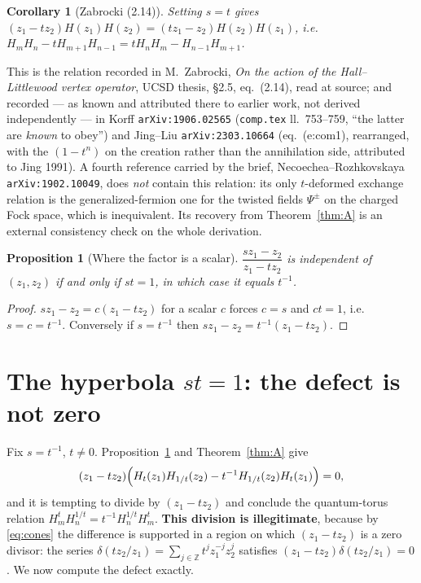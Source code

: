 \documentclass[11pt]{article}
\newtheorem{proposition}[theorem]{Proposition}
\newtheorem{corollary}[theorem]{Corollary}
\theoremstyle{definition}
\newcommand{\Z}{\mathbb{Z}}
\newcommand{\Hop}{H}
\begin{document}
\begin{corollary}[Zabrocki (2.14)]
Setting $s=t$ gives $(z_1-tz_2)\Hop(z_1)\Hop(z_2)=(tz_1-z_2)\Hop(z_2)\Hop(z_1)$, i.e.
$\Hop_m\Hop_n-t\Hop_{m+1}\Hop_{n-1}=t\Hop_n\Hop_m-\Hop_{n-1}\Hop_{m+1}$.
\end{corollary}

This is the relation recorded in M.~Zabrocki, \emph{On the action of the Hall--Littlewood
vertex operator}, UCSD thesis, \S2.5, eq.~(2.14), read at source; and recorded --- as known
and attributed there to earlier work, not derived independently --- in Korff
\texttt{arXiv:1906.02565} (\texttt{comp.tex} ll.~753--759, ``the latter are \emph{known} to
obey'') and Jing--Liu \texttt{arXiv:2303.10664} (eq.~(e:com1), rearranged, with the $(1-t^n)$
on the creation rather than the annihilation side, attributed to Jing 1991). A fourth
reference carried by the brief, Necoechea--Rozhkovskaya \texttt{arXiv:1902.10049}, does
\emph{not} contain this relation: its only $t$-deformed exchange relation is the
generalized-fermion one for the twisted fields $\Psi^\pm$ on the charged Fock space, which is
inequivalent. Its recovery from
Theorem~\ref{thm:A} is an external consistency check on the whole derivation.

\begin{proposition}[Where the factor is a scalar]\label{prop:hyperbola}
$\dfrac{sz_1-z_2}{z_1-tz_2}$ is independent of $(z_1,z_2)$ if and only if $st=1$, in which
case it equals $t^{-1}$.
\end{proposition}

\begin{proof}
$sz_1-z_2=c(z_1-tz_2)$ for a scalar $c$ forces $c=s$ and $ct=1$, i.e.\ $s=c=t^{-1}$.
Conversely if $s=t^{-1}$ then $sz_1-z_2=t^{-1}(z_1-tz_2)$.
\end{proof}

\section{The hyperbola $st=1$: the defect is not zero}

Fix $s=t^{-1}$, $t\neq0$. Proposition~\ref{prop:hyperbola} and Theorem~\ref{thm:A} give
\[
  (z_1-tz_2)\Bigl(\Hop_t(z_1)\Hop_{1/t}(z_2)-t^{-1}\Hop_{1/t}(z_2)\Hop_t(z_1)\Bigr)=0,
\]
and it is tempting to divide by $(z_1-tz_2)$ and conclude the quantum-torus relation
$\Hop^t_m\Hop^{1/t}_n=t^{-1}\Hop^{1/t}_n\Hop^t_m$. \textbf{This division is illegitimate},
because by \eqref{eq:cones} the difference is supported in a region on which
$(z_1-tz_2)$ is a zero divisor: the series $\delta(tz_2/z_1)=\sum_{j\in\Z}t^jz_1^{-j}z_2^{j}$
satisfies $(z_1-tz_2)\delta(tz_2/z_1)=0$. We now compute the defect exactly.
\end{document}
